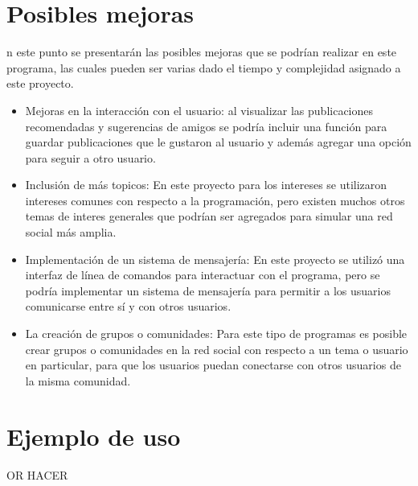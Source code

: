 \documentclass[9pt,letterpaper,onecolumn]{rho-class/rho}
\begin{document}
\newpage
\section{Posibles mejoras}

n este punto se presentarán las posibles mejoras que se podrían realizar en este programa, las cuales pueden ser varias dado el tiempo y complejidad asignado a este proyecto.

\begin{itemize}
	\item Mejoras en la interacción con el usuario: al visualizar las publicaciones recomendadas y sugerencias de amigos se podría incluir una función para guardar publicaciones que le gustaron al usuario y además agregar una opción para seguir a otro usuario.
	\vspace{0.3cm}
	\item Inclusión de más topicos: En este proyecto para los intereses se utilizaron intereses comunes con respecto a la programación, pero existen muchos otros temas de interes generales que podrían ser agregados para simular una red social más amplia.
	\vspace{0.3cm}
	\item Implementación de un sistema de mensajería: En este proyecto se utilizó una interfaz de línea de comandos para interactuar con el programa, pero se podría implementar un sistema de mensajería para permitir a los usuarios comunicarse entre sí y con otros usuarios.
	\vspace{0.3cm}
	\item La creación de grupos o comunidades: Para este tipo de programas es posible crear grupos o comunidades en la red social con respecto a un tema o usuario en particular, para que los usuarios puedan conectarse con otros usuarios de la misma comunidad.
\end{itemize}


\newpage
\section{Ejemplo de uso}

    OR HACER
    
\newpage
\end{document}
